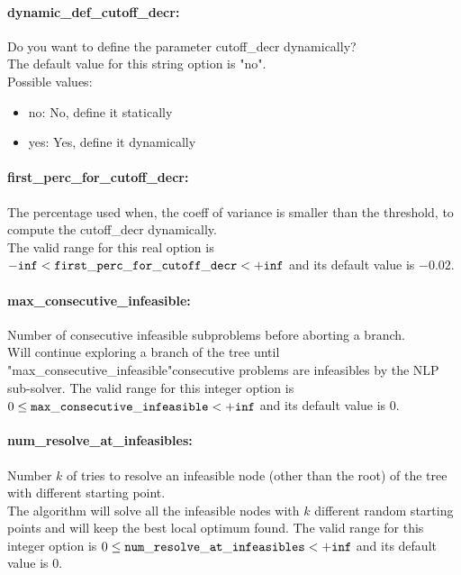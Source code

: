 \paragraph{\bf dynamic\_def\_cutoff\_decr:}\label{sec:dynamic_def_cutoff_decr} Do you want to define the parameter cutoff\_decr dynamically? $\;$ \\

The default value for this string option is "no".
\\ 
Possible values:
\begin{itemize}
   \item no: No, define it statically
   \item yes: Yes, define it dynamically
\end{itemize}

\paragraph{\bf first\_perc\_for\_cutoff\_decr:}\label{sec:first_perc_for_cutoff_decr} The percentage used when, the coeff of variance is smaller than the threshold, to compute the cutoff\_decr dynamically. $\;$ \\
 The valid range for this real option is 
${\tt -inf} <  {\tt first\_perc\_for\_cutoff\_decr } <  {\tt +inf}$
and its default value is $-0.02$.


\paragraph{\bf max\_consecutive\_infeasible:}\label{sec:max_consecutive_infeasible} Number of consecutive infeasible subproblems before aborting a branch. $\;$ \\
 Will continue exploring a branch of the tree
until "max\_consecutive\_infeasible"consecutive
problems are infeasibles by the NLP sub-solver. The valid range for this integer option is
$0 \le {\tt max\_consecutive\_infeasible } <  {\tt +inf}$
and its default value is $0$.


\paragraph{\bf num\_resolve\_at\_infeasibles:}\label{sec:num_resolve_at_infeasibles} Number $k$ of tries to resolve an infeasible node (other than the root) of the tree with different starting point. $\;$ \\
 The algorithm will solve all the infeasible nodes
with $k$ different random starting points and
will keep the best local optimum found. The valid range for this integer option is
$0 \le {\tt num\_resolve\_at\_infeasibles } <  {\tt +inf}$
and its default value is $0$.


